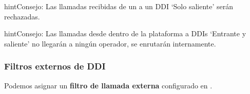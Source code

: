 \documentclass[letterpaper,10pt,spanish]{sphinxmanual}
\begin{document}
\begin{notice}{hint}{Consejo:}
Las llamadas recibidas de un {\hyperref[administration_portal/brand/providers/ddi_providers:ddi\string-providers]{}} a un DDI `Solo saliente' serán rechazadas.
\end{notice}

\begin{notice}{hint}{Consejo:}
Las llamadas desde dentro de la plataforma a DDIs `Entrante y saliente' no llegarán a ningún operador, se enrutarán internamente.
\end{notice}


\subsubsection{Filtros externos de DDI}
\label{administration_portal/client/vpbx/ddis:ddi-external-filters}
Podemos asignar un \textbf{filtro de llamada externa} configurado en {\hyperref[administration_portal/client/vpbx/routing_tools/external_call_filters:external\string-call\string-filters]{}}.
\end{document}
